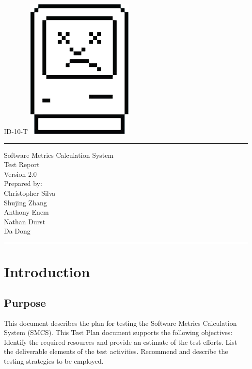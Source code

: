 \documentclass{scrreprt}
\author{Christopher Silva}
\date{}
\begin{document}
	\begin{titlepage}
		\flushright
		\LARGE{ID-10-T}
		\includegraphics[scale=0.08]{logo.png}
		\rule{16cm}{5pt}\vskip1cm
		\centering
		\Huge{Software Metrics Calculation System}\\
		\vspace{2cm}
		\Huge{Test Report}\\
		\vspace{2cm}
		\LARGE{Version 2.0\\}
		\vspace{2cm}
		Prepared by:\\
	    Christopher Silva\\
	    Shujing Zhang\\
		Anthony Enem\\
		Nathan Durst\\
		Da Dong\\
		\vfill
		\rule{16cm}{5pt}
	\end{titlepage}
	\tableofcontents
	{\let\clearpage\relax \chapter{Introduction}}
	
	\section{Purpose}
	This document describes the plan for testing the Software Metrics Calculation System (SMCS). This Test Plan document supports the following objectives:
	Identify the required resources and provide an estimate of the test efforts.
	List the deliverable elements of the test activities.
	Recommend and describe the testing strategies to be employed.
\end{document}

